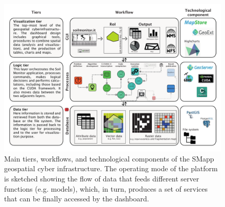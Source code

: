\documentclass[APA,LATO1COL,doublespace]{WileyNJD-v2}
\begin{document}
\begin{figure}[t] %
    \centerline{\includegraphics[width=500pt]{daMileti/02_infrastruttura.pdf}}
    \caption{Main tiers, workflows, and technological components of the SMapp geospatial cyber infrastructure.
    The operating mode of the platform is sketched showing the flow of data that feeds different server functions (e.g. models), which, in turn, produces a set of services that can be finally accessed by the dashboard.
    } \label{fig:GCI}
\end{figure}

\end{document}

